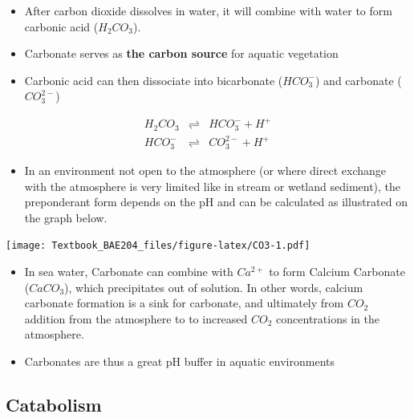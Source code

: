 \documentclass[]{book}
\providecommand{\tightlist}{%
  \setlength{\itemsep}{0pt}\setlength{\parskip}{0pt}}
\theoremstyle{definition}
\theoremstyle{definition}
\theoremstyle{definition}
\theoremstyle{remark}
\begin{document}
\begin{itemize}
\tightlist
\item
  After carbon dioxide dissolves in water, it will combine with water to
  form carbonic acid (\(H_2CO_3\)).
\item
  Carbonate serves as \textbf{the carbon source} for aquatic vegetation
\item
  Carbonic acid can then dissociate into bicarbonate (\(HCO_3^-\)) and
  carbonate (\(CO_3^{2-}\))
\end{itemize}

\begin{align}
H_2CO_3  & \rightleftharpoons & HCO_3^- + H^+  \label{eq:H2CO3} \\
HCO_3^- & \rightleftharpoons & CO_3^{2-} + H^+ \label{eq:HCO3}
\end{align}

\begin{itemize}
\tightlist
\item
  In an environment not open to the atmosphere (or where direct exchange
  with the atmosphere is very limited like in stream or wetland
  sediment), the preponderant form depends on the pH and can be
  calculated as illustrated on the graph below.
\end{itemize}

\texttt{[image: Textbook\_BAE204\_files/figure-latex/CO3-1.pdf]}

\begin{itemize}
\tightlist
\item
  In sea water, Carbonate can combine with \(Ca^{2+}\) to form Calcium
  Carbonate (\(CaCO_3\)), which precipitates out of solution. In other
  words, calcium carbonate formation is a sink for carbonate, and
  ultimately from \(CO_2\) addition from the atmosphere to to increased
  \(CO_2\) concentrations in the atmosphere.
\item
  Carbonates are thus a great pH buffer in aquatic environments
\end{itemize}

\hypertarget{catabolism}{\subsection{Catabolism}\label{catabolism}}
\end{document}
